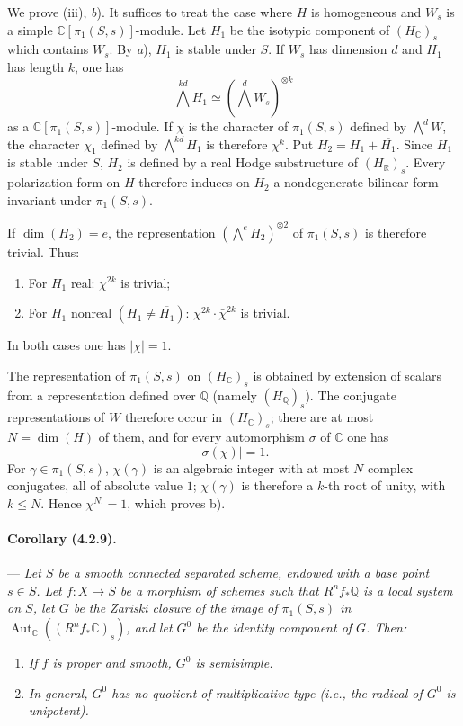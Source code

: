 \documentclass[10pt]{article}
\newcommand{\C}{\mathbb C}
\newcommand{\Q}{\mathbb Q}
\newcommand{\R}{\mathbb R}
\providecommand{\Aut}{\operatorname{Aut}}
\begin{document}
We prove (iii), \textit{b}). It suffices to treat the case where $H$ is homogeneous and $W_s$ is a simple $\C[\pi_1(S,s)]$-module. Let $H_1$ be the isotypic component of $(H_\C)_s$ which contains $W_s$. By \textit{a}), $H_1$ is stable under $S$. If $W_s$ has dimension $d$ and $H_1$ has length $k$, one has
\[
\bigwedge^{kd}H_1\simeq(\bigwedge^dW_s)^{\otimes k}
\]
as a $\C[\pi_1(S,s)]$-module. If $\chi$ is the character of $\pi_1(S,s)$ defined by $\bigwedge^dW$, the character $\chi_1$ defined by $\bigwedge^{kd}H_1$ is therefore $\chi^k$. Put $H_2=H_1+\overline{H_1}$. Since $H_1$ is stable under $S$, $H_2$ is defined by a real Hodge substructure of $(H_\R)_s$. Every polarization form on $H$ therefore induces on $H_2$ a nondegenerate bilinear form invariant under $\pi_1(S,s)$.

If $\dim(H_2)=e$, the representation $(\bigwedge^eH_2)^{\otimes2}$ of $\pi_1(S,s)$ is therefore trivial. Thus:
\begin{enumerate}[label=\alph*)]
\item For $H_1$ real: $\chi^{2k}$ is trivial;
\item For $H_1$ nonreal $(H_1\ne\overline{H_1})$: $\chi^{2k}\cdot\bar\chi^{2k}$ is trivial.
\end{enumerate}
In both cases one has $|\chi|=1$.

The representation of $\pi_1(S,s)$ on $(H_\C)_s$ is obtained by extension of scalars from a representation defined over $\Q$ (namely $(H_\Q)_s$). The conjugate representations of $W$ therefore occur in $(H_\C)_s$; there are at most $N=\dim(H)$ of them, and for every automorphism $\sigma$ of $\C$ one has
\[
|\sigma(\chi)|=1.
\]
For $\gamma\in\pi_1(S,s)$, $\chi(\gamma)$ is an algebraic integer with at most $N$ complex conjugates, all of absolute value $1$; $\chi(\gamma)$ is therefore a $k$-th root of unity, with $k\le N$. Hence $\chi^{N!}=1$, which proves b).

\paragraph{Corollary (4.2.9).} --- {\itshape Let $S$ be a smooth connected separated scheme, endowed with a base point $s\in S$. Let $f:X\to S$ be a morphism of schemes such that $R^nf_*\Q$ is a local system on $S$, let $G$ be the Zariski closure of the image of $\pi_1(S,s)$ in $\Aut_\C((R^nf_*\C)_s)$, and let $G^0$ be the identity component of $G$. Then:}
\begin{enumerate}[label=\alph*)]
\item {\itshape If $f$ is proper and smooth, $G^0$ is semisimple.}
\item {\itshape In general, $G^0$ has no quotient of multiplicative type (i.e., the radical of $G^0$ is unipotent).}
\end{enumerate}
\end{document}
